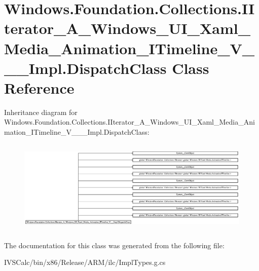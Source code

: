 \hypertarget{class_windows_1_1_foundation_1_1_collections_1_1_i_iterator___a___windows___u_i___xaml___media__3e5eab471ebe2737d028767f2c825858}{}\section{Windows.\+Foundation.\+Collections.\+I\+Iterator\+\_\+\+A\+\_\+\+Windows\+\_\+\+U\+I\+\_\+\+Xaml\+\_\+\+Media\+\_\+\+Animation\+\_\+\+I\+Timeline\+\_\+\+V\+\_\+\+\_\+\+\_\+\+Impl.\+Dispatch\+Class Class Reference}
\label{class_windows_1_1_foundation_1_1_collections_1_1_i_iterator___a___windows___u_i___xaml___media__3e5eab471ebe2737d028767f2c825858}
Inheritance diagram for Windows.\+Foundation.\+Collections.\+I\+Iterator\+\_\+\+A\+\_\+\+Windows\+\_\+\+U\+I\+\_\+\+Xaml\+\_\+\+Media\+\_\+\+Animation\+\_\+\+I\+Timeline\+\_\+\+V\+\_\+\+\_\+\+\_\+\+Impl.\+Dispatch\+Class\+:\begin{figure}[H]
\begin{center}
\leavevmode
\includegraphics[height=4.536082cm]{class_windows_1_1_foundation_1_1_collections_1_1_i_iterator___a___windows___u_i___xaml___media__3e5eab471ebe2737d028767f2c825858}
\end{center}
\end{figure}


The documentation for this class was generated from the following file\+:\begin{DoxyCompactItemize}
\item 
I\+V\+S\+Calc/bin/x86/\+Release/\+A\+R\+M/ilc/Impl\+Types.\+g.\+cs\end{DoxyCompactItemize}
